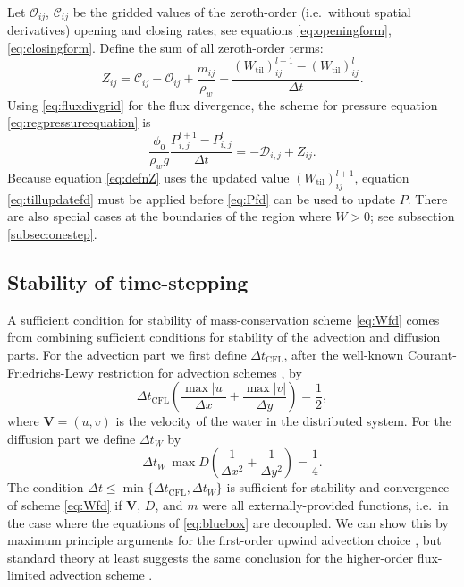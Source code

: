 \documentclass[gmd]{copernicus}   %
\begin{document}
Let $\mathcal{O}_{ij}$, $\mathcal{C}_{ij}$ be the gridded values of the zeroth-order (i.e.~without spatial derivatives) opening and closing rates; see equations \eqref{eq:openingform}, \eqref{eq:closingform}.  Define the sum of all zeroth-order terms:
\begin{equation}
Z_{ij} = \mathcal{C}_{ij} - \mathcal{O}_{ij} + \frac{m_{ij}}{\rho_w} - \frac{(W_{\text{til}})_{ij}^{l+1} - (W_{\text{til}})_{ij}^l}{\Delta t}.  \label{eq:defnZ}
\end{equation}
Using \eqref{eq:fluxdivgrid} for the flux divergence, the scheme for pressure equation \eqref{eq:regpressureequation} is
\begin{equation}
\frac{\phi_0}{\rho_w g} \frac{P_{i,j}^{l+1} - P_{i,j}^l}{\Delta t} = - \mathcal{D}_{i,j} + Z_{ij}. \label{eq:Pfd}
\end{equation}
Because equation \eqref{eq:defnZ} uses the updated value $(W_{\text{til}})_{ij}^{l+1}$, equation \eqref{eq:tillupdatefd} must be applied before \eqref{eq:Pfd} can be used to update $P$.  There are also special cases at the boundaries of the region where $W>0$; see subsection \ref{subsec:onestep}.

\subsection{Stability of time-stepping}  A sufficient condition for stability of mass-conservation scheme \eqref{eq:Wfd} comes from combining sufficient conditions for stability of the advection and diffusion parts.  For the advection part we first define $\Delta t_{\text{CFL}}$, after the well-known Courant-Friedrichs-Lewy restriction for advection schemes \citep{MortonMayers}, by
\begin{equation}
\Delta t_{\text{CFL}} \left(\frac{\max |u|}{\Delta x} + \frac{\max |v|}{\Delta y}\right) = \frac{1}{2}, \label{eq:dtCFL}
\end{equation}
where $\mathbf{V}=(u,v)$ is the velocity of the water in the distributed system.  For the diffusion part we define $\Delta t_{W}$ by
\begin{equation}
\Delta t_W\, \max D \left(\frac{1}{\Delta x^2} + \frac{1}{\Delta y^2}\right) = \frac{1}{4}. \label{eq:dtDIFFW}
\end{equation}
The condition $\Delta t \le \min\{\Delta t_{\text{CFL}}, \Delta t_W\}$ is sufficient for stability and convergence of scheme \eqref{eq:Wfd} if $\mathbf{V}$, $D$, and $m$ were all externally-provided functions, i.e.~in the case where the equations of \eqref{eq:bluebox} are decoupled.  We can show this by maximum principle arguments for the first-order upwind advection choice \citep{MortonMayers}, but standard theory at least suggests the same conclusion for the higher-order flux-limited advection scheme \citep{HundsdorferVerwer2010}.
\end{document}
